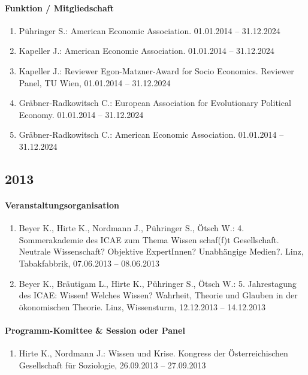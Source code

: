 \paragraph{Funktion / Mitgliedschaft}
\begin{enumerate}[leftmargin=*, labelsep=0.5cm]
\item Pühringer S.: American Economic Association. 01.01.2014 -- 31.12.2024
\item Kapeller J.: American Economic Association. 01.01.2014 -- 31.12.2024
\item Kapeller J.: Reviewer Egon-Matzner-Award for Socio Economics. Reviewer Panel, TU Wien, 01.01.2014 -- 31.12.2024
\item Gräbner-Radkowitsch C.: European Association for Evolutionary Political Economy. 01.01.2014 -- 31.12.2024
\item Gräbner-Radkowitsch C.: American Economic Association. 01.01.2014 -- 31.12.2024
\end{enumerate}
\subsection*{2013}
\paragraph{Veranstaltungsorganisation}
\begin{enumerate}[leftmargin=*, labelsep=0.5cm]
\item Beyer K., Hirte K., Nordmann J., Pühringer S., Ötsch W.: 4. Sommerakademie des ICAE zum Thema  	  Wissen schaf(f)t Gesellschaft. Neutrale Wissenschaft? Objektive ExpertInnen? Unabhängige Medien?. Linz, Tabakfabbrik, 07.06.2013 -- 08.06.2013
\item Beyer K., Bräutigam L., Hirte K., Pühringer S., Ötsch W.: 5. Jahrestagung des ICAE: Wissen! Welches Wissen? Wahrheit, Theorie und Glauben in der ökonomischen Theorie. Linz, Wissensturm, 12.12.2013 -- 14.12.2013
\end{enumerate}

\paragraph{Programm-Komittee \& Session oder Panel}
\begin{enumerate}[leftmargin=*, labelsep=0.5cm]
\item Hirte K., Nordmann J.: Wissen und Krise. Kongress der Österreichischen Gesellschaft für Soziologie, 26.09.2013 -- 27.09.2013
\end{enumerate}

